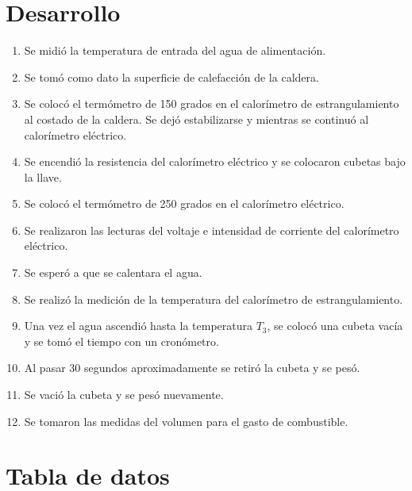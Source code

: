 \documentclass[12pt,letterpaper]{article}
\begin{document}
\section{Desarrollo}
\begin{enumerate}
    \item Se midió la temperatura de entrada del agua de alimentación.
    \item Se tomó como dato la superficie de calefacción de la caldera.
    \item Se colocó el termómetro de 150 grados en el calorímetro de estrangulamiento al costado de 
    la caldera. Se dejó estabilizarse y mientras se continuó al calorímetro eléctrico.
    \item Se encendió la resistencia del calorímetro eléctrico y se colocaron cubetas bajo la llave.
    \item Se colocó el termómetro de 250 grados en el calorímetro eléctrico.
    \item Se realizaron las lecturas del voltaje e intensidad 
    de corriente del calorímetro eléctrico.
    \item Se esperó a que se calentara el agua.
    \item Se realizó la medición de la temperatura del calorímetro de estrangulamiento.
    \item Una vez el agua ascendió hasta la temperatura $T_3$, se colocó una cubeta vacía y
    se tomó el tiempo con un cronómetro.
    \item Al pasar 30 segundos aproximadamente se retiró la cubeta y se pesó.
    \item Se vació la cubeta y se pesó nuevamente.
    \item Se tomaron las medidas del volumen para el gasto de combustible.
\end{enumerate}

\vfill

\section{Tabla de datos}
\end{document}
